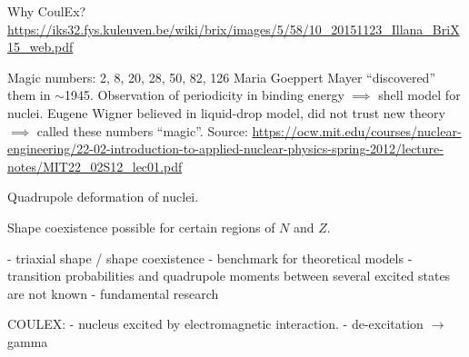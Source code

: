 \documentclass[twoside,english]{uiofysmaster/uiofysmaster}
\begin{document}
Why CoulEx? \url{https://iks32.fys.kuleuven.be/wiki/brix/images/5/58/10_20151123_Illana_BriX15_web.pdf} \newline


Magic numbers: 2, 8, 20, 28, 50, 82, 126 \newline
Maria Goeppert Mayer “discovered” them in $\sim$1945. Observation of periodicity in binding energy $\implies$ shell model for nuclei. \newline
Eugene Wigner believed in liquid-drop model, did not trust new theory $\implies$ called these numbers “magic”. \newline
Source: \url{https://ocw.mit.edu/courses/nuclear-engineering/22-02-introduction-to-applied-nuclear-physics-spring-2012/lecture-notes/MIT22_02S12_lec01.pdf}

\bigskip

Quadrupole deformation of nuclei. \newline

Shape coexistence possible for certain regions of $N$ and $Z$.

\bigskip

- triaxial shape / shape coexistence \newline
- benchmark for theoretical models \newline
- transition probabilities and quadrupole moments between several excited states are not known \newline
- fundamental research

\bigskip

COULEX: \newline
- nucleus excited by electromagnetic interaction. \newline
- de-excitation $\rightarrow$ gamma

\bigskip
\end{document}
